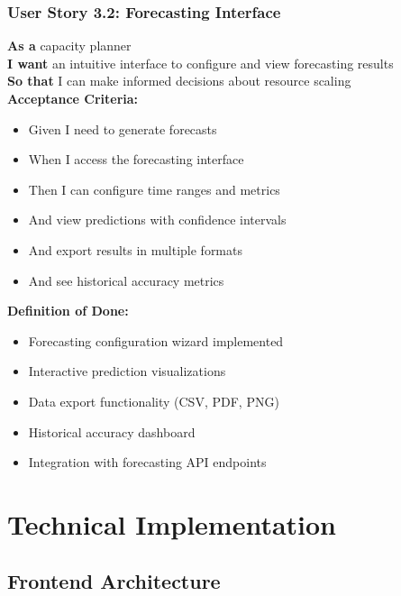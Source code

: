 \subsubsection{User Story 3.2: Forecasting Interface}

\begin{tcolorbox}[colback=lightgray, colframe=primaryblue, title=US-3.2: Forecasting Interface]
\textbf{As a} capacity planner \\
\textbf{I want} an intuitive interface to configure and view forecasting results \\
\textbf{So that} I can make informed decisions about resource scaling \\

\textbf{Acceptance Criteria:}
\begin{itemize}
    \item Given I need to generate forecasts
    \item When I access the forecasting interface
    \item Then I can configure time ranges and metrics
    \item And view predictions with confidence intervals
    \item And export results in multiple formats
    \item And see historical accuracy metrics
\end{itemize}

\textbf{Definition of Done:}
\begin{itemize}
    \item Forecasting configuration wizard implemented
    \item Interactive prediction visualizations
    \item Data export functionality (CSV, PDF, PNG)
    \item Historical accuracy dashboard
    \item Integration with forecasting API endpoints
\end{itemize}
\end{tcolorbox}

\section{Technical Implementation}

\subsection{Frontend Architecture}

